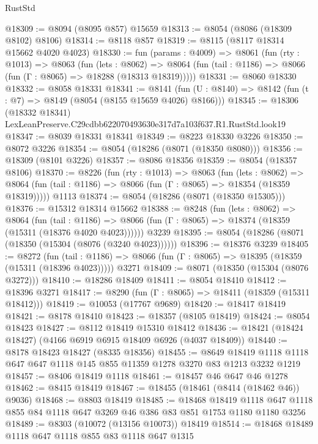 \begin{lexlean}{RustStd}
\begin{coremodule}
@18309 := @8094 (@8095 @857) @15659
@18313 := @8054 (@8086 (@18309 @8102) @8106)
@18314 := @8118 @857
@18319 := @8115 (@8117 @18314 @15662 @4020 @4023)
@18330 := fun (params : @4009) =>
  @8061
    (fun (rty : @1013) =>
    @8063
      (fun (lets : @8062) =>
      @8064 (fun (tail : @1186) => @8066 (fun (Γ : @8065) => @18288 (@18313 @18319)))))
@18331 := @8060 @18330
@18332 := @8058 @18331
@18341 := @8141
    (fun (U : @8140) => @8142 (fun (t : @7) => @8149 (@8054 (@8155 @15659 @4026) @8166)))
@18345 := @18306 (@18332 @18341) LexLeanPreserve.C29cdbb622070493630e317d7a103f637.R1.RustStd.look19
@18347 := @8039 @18331 @18341
@18349 := @8223 @18330 @3226
@18350 := @8072 @3226
@18354 := @8054 (@18286 (@8071 (@18350 @8080)))
@18356 := @18309 (@8101 @3226)
@18357 := @8086 @18356
@18359 := @8054 (@18357 @8106)
@18370 := @8226
    (fun (rty : @1013) =>
    @8063
      (fun (lets : @8062) =>
      @8064 (fun (tail : @1186) => @8066 (fun (Γ : @8065) => @18354 (@18359 @18319)))))
    @1113
@18374 := @8054 (@18286 (@8071 (@18350 @15305)))
@18376 := @15312 @18314 @15662
@18388 := @8248
    (fun (lets : @8062) =>
    @8064
      (fun (tail : @1186) =>
      @8066 (fun (Γ : @8065) => @18374 (@18359 (@15311 (@18376 @4020 @4023))))))
    @3239
@18395 := @8054 (@18286 (@8071 (@18350 (@15304 (@8076 (@3240 @4023))))))
@18396 := @18376 @3239
@18405 := @8272
    (fun (tail : @1186) => @8066 (fun (Γ : @8065) => @18395 (@18359 (@15311 (@18396 @4023)))))
    @3271
@18409 := @8071 (@18350 (@15304 (@8076 @3272)))
@18410 := @18286 @18409
@18411 := @8054 @18410
@18412 := @18396 @3271
@18417 := @8290 (fun (Γ : @8065) => @18411 (@18359 (@15311 @18412)))
@18419 := @10053 (@17767 @9689)
@18420 := @18417 @18419
@18421 := @8178 @18410
@18423 := @18357 (@8105 @18419)
@18424 := @8054 @18423
@18427 := @8112 @18419 @15310 @18412
@18436 := @18421 (@18424 @18427) (@4166 @6919 @6915 @18409 @6926 (@4037 @18409))
@18440 := @8178 @18423 @18427 (@8335 @18356)
@18455 := @8649
    @18419
    @1118
    @1118
    @647
    @647
    @1118
    @145
    @855
    @11359
    @1278
    @3270
    @83
    @1213
    @3232
    @1219
@18457 := @8406 @18419 @1118
@18461 := @18457 @46 @647 @46 @1278
@18462 := @8415 @18419
@18467 := @18455 (@18461 (@8414 (@18462 @46)) @9036)
@18468 := @8803 @18419
@18485 := @18468
    @18419
    @1118
    @647
    @1118
    @855
    @84
    @1118
    @647
    @3269
    @46
    @386
    @83
    @851
    @1753
    @1180
    @1180
    @3256
@18489 := @8303 (@10072 (@13156 @10073)) @18419
@18514 := @18468
    @18489
    @1118
    @647
    @1118
    @855
    @83
    @1118
    @647
    @1315

\end{coremodule}
\end{lexlean}
